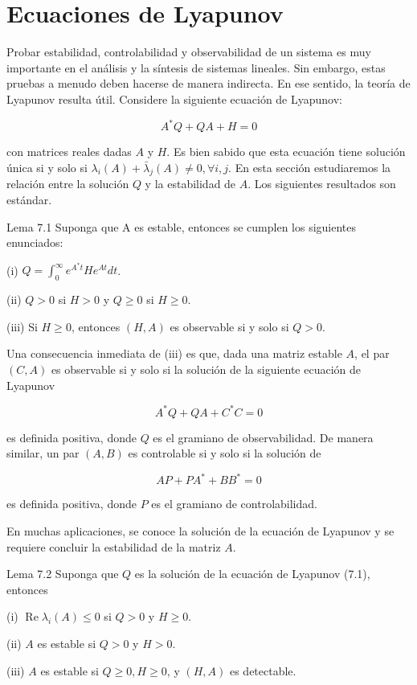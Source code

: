 \section{Ecuaciones de Lyapunov}
Probar estabilidad, controlabilidad y observabilidad de un sistema es muy importante en el análisis y la síntesis de sistemas lineales. Sin embargo, estas pruebas a menudo deben hacerse de manera indirecta. En ese sentido, la teoría de Lyapunov resulta útil. Considere la siguiente ecuación de Lyapunov:


\begin{equation*}
A^{*} Q+Q A+H=0 \tag{7.1}
\end{equation*}


con matrices reales dadas $A$ y $H$. Es bien sabido que esta ecuación tiene solución única si y solo si $\lambda_{i}(A)+\bar{\lambda}_{j}(A) \neq 0, \forall i, j$. En esta sección estudiaremos la relación entre la solución $Q$ y la estabilidad de $A$. Los siguientes resultados son estándar.

Lema 7.1 Suponga que A es estable, entonces se cumplen los siguientes enunciados:

(i) $Q=\int_{0}^{\infty} e^{A^{*} t} H e^{A t} d t$.

(ii) $Q>0$ si $H>0$ y $Q \geq 0$ si $H \geq 0$.

(iii) Si $H \geq 0$, entonces $(H, A)$ es observable si y solo si $Q>0$.

Una consecuencia inmediata de (iii) es que, dada una matriz estable $A$, el par $(C, A)$ es observable si y solo si la solución de la siguiente ecuación de Lyapunov

$$
A^{*} Q+Q A+C^{*} C=0
$$

es definida positiva, donde $Q$ es el gramiano de observabilidad. De manera similar, un par $(A, B)$ es controlable si y solo si la solución de

$$
A P+P A^{*}+B B^{*}=0
$$

es definida positiva, donde $P$ es el gramiano de controlabilidad.

En muchas aplicaciones, se conoce la solución de la ecuación de Lyapunov y se requiere concluir la estabilidad de la matriz $A$.

Lema 7.2 Suponga que $Q$ es la solución de la ecuación de Lyapunov (7.1), entonces

(i) $\operatorname{Re} \lambda_{i}(A) \leq 0$ si $Q>0$ y $H \geq 0$.

(ii) $A$ es estable si $Q>0$ y $H>0$.

(iii) $A$ es estable si $Q \geq 0, H \geq 0$, y $(H, A)$ es detectable.


